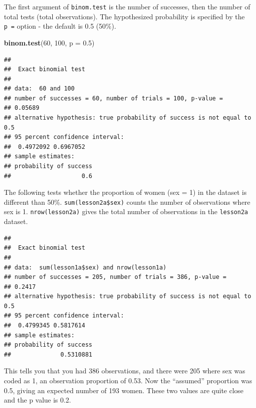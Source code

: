 \documentclass[]{book}
\newenvironment{Shaded}{\begin{snugshade}}{\end{snugshade}}
\newcommand{\DataTypeTok}[1]{\textcolor[rgb]{0.13,0.29,0.53}{#1}}
\newcommand{\DecValTok}[1]{\textcolor[rgb]{0.00,0.00,0.81}{#1}}
\newcommand{\FloatTok}[1]{\textcolor[rgb]{0.00,0.00,0.81}{#1}}
\newcommand{\KeywordTok}[1]{\textcolor[rgb]{0.13,0.29,0.53}{\textbf{#1}}}
\newcommand{\NormalTok}[1]{#1}
\newcommand{\OperatorTok}[1]{\textcolor[rgb]{0.81,0.36,0.00}{\textbf{#1}}}
\begin{document}
The first argument of \texttt{binom.test} is the number of successes,
then the number of total tests (total observations). The hypothesized
probability is specified by the \texttt{p\ =} option - the default is
0.5 (50\%).

\begin{Shaded}
\begin{Highlighting}[]
\KeywordTok{binom.test}\NormalTok{(}\DecValTok{60}\NormalTok{, }\DecValTok{100}\NormalTok{, }\DataTypeTok{p =} \FloatTok{0.5}\NormalTok{)}
\end{Highlighting}
\end{Shaded}

\begin{verbatim}
## 
##  Exact binomial test
## 
## data:  60 and 100
## number of successes = 60, number of trials = 100, p-value =
## 0.05689
## alternative hypothesis: true probability of success is not equal to 0.5
## 95 percent confidence interval:
##  0.4972092 0.6967052
## sample estimates:
## probability of success 
##                    0.6
\end{verbatim}

The following tests whether the proportion of women (sex = 1) in the
dataset is different than 50\%. \texttt{sum(lesson2a\$sex)} counts the
number of observations where sex is 1. \texttt{nrow(lesson2a)} gives the
total number of observations in the \texttt{lesson2a} dataset.

\begin{Shaded}
\end{Shaded}

\begin{verbatim}
## 
##  Exact binomial test
## 
## data:  sum(lesson1a$sex) and nrow(lesson1a)
## number of successes = 205, number of trials = 386, p-value =
## 0.2417
## alternative hypothesis: true probability of success is not equal to 0.5
## 95 percent confidence interval:
##  0.4799345 0.5817614
## sample estimates:
## probability of success 
##              0.5310881
\end{verbatim}

This tells you that you had 386 observations, and there were 205 where
sex was coded as 1, an observation proportion of 0.53. Now the
``assumed'' proportion was 0.5, giving an expected number of 193 women.
These two values are quite close and the p value is 0.2.
\end{document}
